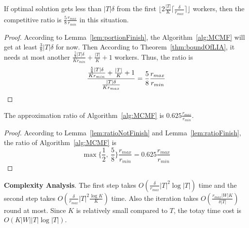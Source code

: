 \begin{lemma}
\label{lem:ratioFinish}
If optimal solution gets less than $|T|\delta$ from the first $\lfloor 2\frac{|T|}{K}\lceil \frac{\delta}{r_{max}} \rceil \rfloor$ workers,
then the competitive ratio is $\frac{5}{8}\frac{r_{max}}{r_{min}}$ in this situation.
\end{lemma}
\begin{proof}
According to Lemma~\ref{lem:portionFinish}, the Algorithm~\ref{alg:MCMF} will get at least $\frac{3}{8}|T|\delta$ for now.
Then According to Theorem~\ref{thm:boundOfLIA}, it needs at most another $\frac{\frac{5}{8}|T|\delta}{Kr_{min}} + \frac{|T|}{K} + 1$ workers.
Thus, the ratio is
\begin{equation*}
	\frac{\frac{\frac{5}{8}|T|\delta}{Kr_{min}} + \frac{|T|}{K} + 1}{\frac{|T|\delta}{Kr_{max}}} = \frac{5}{8}\frac{r_{max}}{r_{min}} \\
\end{equation*}
\end{proof}

\begin{theorem}
The approximation ratio of Algorithm~\ref{alg:MCMF} is $0.625\frac{r_{max}}{r_{min}}$.
\end{theorem}
\begin{proof}
According to Lemma~\ref{lem:ratioNotFinish} and Lemma~\ref{lem:ratioFinish}, the ratio of Algorithm~\ref{alg:MCMF} is
\begin{equation*}
	\max\{\frac{1}{2},\ \frac{5}{8}\} {\frac{r_{max}}{r_{min}}} = 0.625\frac{r_{max}}{r_{min}}
\end{equation*}
\end{proof}

\textbf{Complexity Analysis}. 
The first step takes $O(\frac{\delta}{r_{max}} |T|^2\log{|T|})$ time and
the second step takes $O(\frac{\delta}{r_{max}} |T|^2\frac{\log{K}}{K})$ time.
Also the iteration takes $O(\frac{r_{max}|W|K}{\delta|T|})$ round at most.
Since $K$ is relatively small compared to $T$, the totay time cost is
$O(K|W||T|\log{|T|})$.